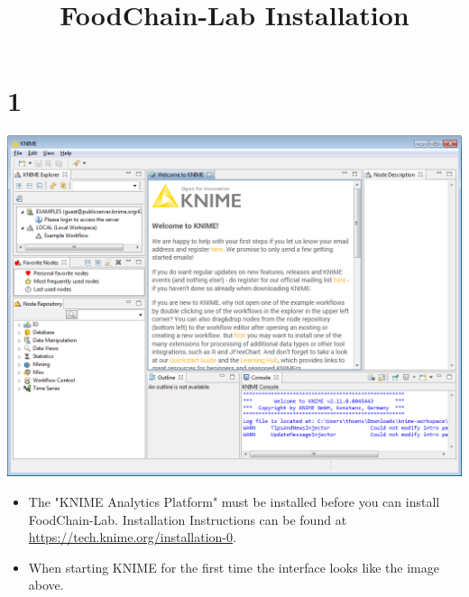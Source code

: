 \documentclass{beamer}
\title{FoodChain-Lab Installation}
\date{}
\begin{document}
\maketitle
 
\section{1}
\begin{frame}
	\begin{center}
  		\includegraphics[height=0.6\textheight]{1.png}
	\end{center}
	\begin{itemize}
		\item The "KNIME Analytics Platform" must be installed before you can install FoodChain-Lab. Installation Instructions can be found at \url{https://tech.knime.org/installation-0}.
		\item When starting KNIME for the first time the interface looks like the image above.
	\end{itemize}
\end{frame}
\end{document}
